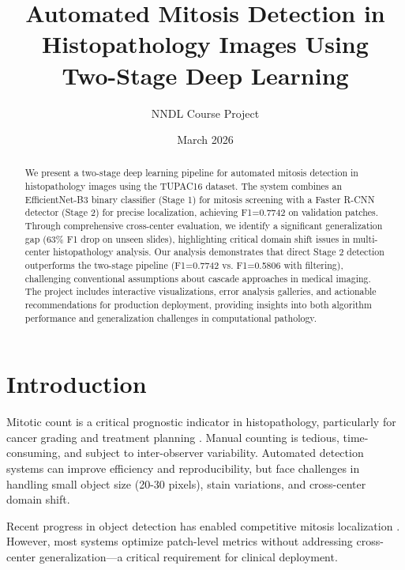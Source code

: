 \documentclass[11pt,a4paper]{article}
\title{Automated Mitosis Detection in Histopathology Images Using\\
Two-Stage Deep Learning}
\author{NNDL Course Project}
\date{March 2026}
\begin{document}
\maketitle

\begin{abstract}

We present a two-stage deep learning pipeline for automated mitosis detection 
in histopathology images using the TUPAC16 dataset. The system combines an 
EfficientNet-B3 binary classifier (Stage 1) for mitosis screening with a 
Faster R-CNN detector (Stage 2) for precise localization, achieving F1=0.7742 
on validation patches. Through comprehensive cross-center evaluation, we identify 
a significant generalization gap (63\% F1 drop on unseen slides), highlighting 
critical domain shift issues in multi-center histopathology analysis. Our analysis 
demonstrates that direct Stage 2 detection outperforms the two-stage pipeline 
(F1=0.7742 vs. F1=0.5806 with filtering), challenging conventional assumptions 
about cascade approaches in medical imaging. The project includes interactive 
visualizations, error analysis galleries, and actionable recommendations for 
production deployment, providing insights into both algorithm performance and 
generalization challenges in computational pathology.

\end{abstract}

\section{Introduction}

Mitotic count is a critical prognostic indicator in histopathology, particularly 
for cancer grading and treatment planning \cite{Veta2013}. Manual counting is 
tedious, time-consuming, and subject to inter-observer variability. Automated 
detection systems can improve efficiency and reproducibility, but face challenges 
in handling small object size (20-30 pixels), stain variations, and cross-center 
domain shift.

Recent progress in object detection has enabled competitive mitosis localization 
\cite{He2015,Cai2018}. However, most systems optimize patch-level metrics without 
addressing cross-center generalization—a critical requirement for clinical deployment.
\end{document}
